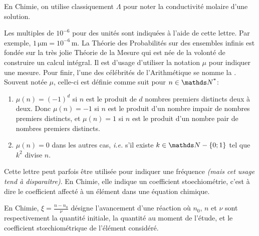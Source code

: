 \cadre{$\Lambda$} En Chimie, on utilise classiquement $\Lambda$ pour noter la conductivité molaire d'une solution.


\vspace{0.8em}

\cadre{$\mu$} Les multiples de $10^{-6}$ pour des unités sont indiquées à l'aide de cette lettre. Par exemple, $1 \, \si{\micro\metre} = 10^{-6} \, \si{\metre}$.
La Théorie des Probabilités sur des ensembles infinis est fondée sur la très jolie Théorie de la Mesure qui est née de la volonté de construire un calcul intégral. Il est d'usage d'utiliser la notation $\mu$ pour indiquer une mesure.
Pour finir, l'une des célébrités de l'Arithmétique se nomme la . Souvent notée $\mu$, celle-ci est définie comme suit pour $n \in \NNs$:
\begin{enumerate}
    \renewcommand{\labelitemi}{$\bullet$}

    \item $\mu(n) = (-1)^d$ si $n$ est le produit de $d$ nombres premiers distincts deux à deux. Donc $\mu(n) = -1$ si $n$ est le produit d'un nombre impair de nombres premiers distincts, et $\mu(n) = 1$ si $n$ est le produit d'un nombre pair de nombres premiers distincts.

    \item $\mu(n) = 0$ dans les autres cas, \textit{i.e.} s'il existe $k \in \NN - \{0 ; 1\}$ tel que $k^2$ divise $n$.
\end{enumerate}


\cadre{$\nu$} Cette lettre peut parfois être utilisée pour indiquer une fréquence \emph{(mais cet usage tend à disparaître)}. En Chimie, elle indique un coefficient stoechiométrie, c'est à dire le coefficient affecté à un élément dans une équation chimique.


\cadre{$\xi$} En Chimie, $\xi = \frac{n - n_0}{\nu}$  désigne l'avancement d'une réaction où $n_0$, $n$ et $\nu$ sont respectivement la quantité initiale, la quantité au moment de l'étude, et le coefficient stœchiométrique de l'élément considéré.



